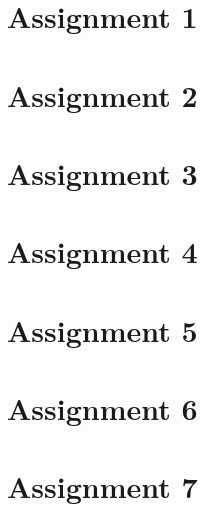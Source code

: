 \documentclass{article}
\begin{document}
\newtheorem{definizione}{Definizione}
\tableofcontents
\section{Assignment 1}

\section{Assignment 2}

\section{Assignment 3}

\section{Assignment 4}

\section{Assignment 5}

\section{Assignment 6}

\section{Assignment 7}
\end{document}
